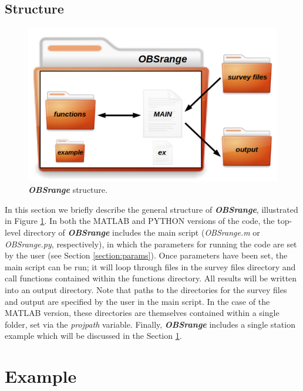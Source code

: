 \documentclass[titlepage, 12pt]{article}
\begin{document}
  \newpage
  \subsection{Structure}
   
   \begin{figure}[!htb]
    \includegraphics[width=\linewidth]{OBSrange_structure.png}
    \caption{\textbf{\textit{OBSrange}} structure.}
    \label{fig:struct}
   \end{figure}

   In this section we briefly describe the general structure of \textbf{\textit{OBSrange}},  illustrated in Figure \ref{fig:struct}. In both the MATLAB and PYTHON versions of the code, the top-level directory of \textbf{\textit{OBSrange}} includes the main script (\textit{OBSrange.m} or \textit{OBSrange.py}, respectively), in which the parameters for running the code are set by the user (see Section \ref{section:params}). Once parameters have been set, the main script can be run; it will loop through files in the survey files directory and call functions contained within the functions directory. All results will be written into an output directory. Note that paths to the directories for the survey files and output are specified by the user in the main script. In the case of the MATLAB version, these directories are themselves contained within a single folder, set via the \textit{projpath} variable. Finally, \textbf{\textit{OBSrange}} includes a single station example which will be discussed in the Section \ref{section:ex}.

 
 \section{Example}
 \label{section:ex}
\end{document}
